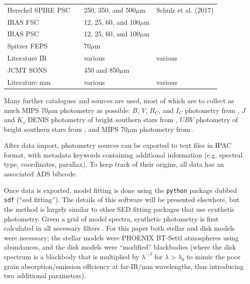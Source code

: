 \documentclass[a4paper,fleqn,usenatbib]{mnras}
\begin{document}
\begin{table}
\begin{tabular}{llll}
    Herschel SPIRE PSC &  & 250, 350, and 500$\mu$m & Schulz et al. (2017) \\
    IRAS FSC &  & 12, 25, 60, and 100$\mu$m & \citet{1990IRASF.C......0M} \\
    IRAS PSC &  & 12, 25, 60, and 100$\mu$m & \citet{1988iras....1.....B} \\
    Spitzer FEPS &  & 70$\mu$m & \citet{2008ApJS..179..423C} \\
    Literature IR &  & various & various \\
    \hline
    JCMT SONS &  & 450 and 850$\mu$m & \citet{2017arXiv170601218H} \\
    Literature mm &  & various & various \\
    \hline
  \end{tabular}
\end{table}

Many further catalogues and sources are used, most of which are to
collect as much MIPS 70$\mu$m photometry as possible: $B$, $V$, $R_C$,
and $I_C$ photometry from \citet{1990A&AS...83..357B}, $J$ and $K_s$
DENIS photometry of bright southern stars from
\citet{2004A&A...413.1037K}, $UBV$ photometry of bright southern stars
from \citet{2010MNRAS.403.1949K}, and MIPS 70$\mu$m photometry from
\citet{2006ApJ...652.1674B,2006ApJ...636.1098B,2009ApJ...705.1226B,2009ApJ...705.1646C,2012ApJ...756..133C,2014ApJS..211...25C,2013ApJ...768...25G,2007ApJ...667..527G,2010ApJ...710L..26K,2005ApJ...631.1170L,2011ApJS..193....4M,2009ApJ...699.1067M,2009ApJ...698.1068P,2008ApJ...681.1484R,2006ApJ...653..675S,2007ApJ...658.1289T,2008ApJ...674.1086T,2011ApJ...732...61Z}.

After data import, photometry sources can be exported to text files in
IPAC format, with metadata keywords containing additional information
(e.g. spectral type, coordinates, parallax). To keep track of their
origins, all data has an associated ADS bibcode.

Once data is exported, model fitting is done using the \texttt{python}
package dubbed \texttt{sdf} (``sed fitting''). The details of this
software will be presented elsewhere, but the method is largely similar
to other SED fitting packages that use synthetic photometry. Given a
grid of model spectra, synthetic photometry is first calculated in all
necessary filters \citep[see][for a primer]{2012PASP..124..140B}. For
this paper both stellar and disk models were necessary; the stellar
models were PHOENIX BT-Settl atmospheres using
\citet{2009ARA&A..47..481A} abundances, and the disk models were
``modified'' blackbodies (where the disk spectrum is a blackbody that is
multiplied by $\lambda^{-\beta}$ for $\lambda>\lambda_0$ to mimic the
poor grain absorption/emission efficiency at far-IR/mm wavelengths, thus
introducing two additional parameters).
\end{document}
